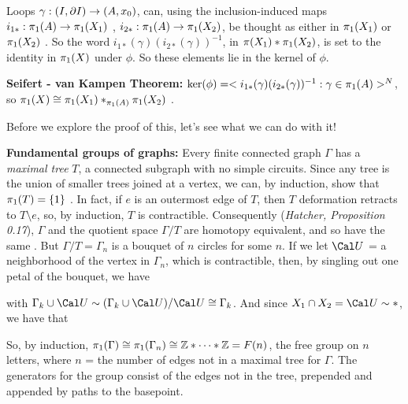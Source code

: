 \msk

Loops $\gamma:(I,\partial I)\rightarrow (A,x_0)$, can, using the inclusion-induced maps  
$i_{1*}:\pi_1(A)\rightarrow \pi_1(X_1)$ , $i_{2*}:\pi_1(A)\rightarrow \pi_1(X_2)$, be thought as either in 
$\pi_1(X_1)$ or $\pi_1(X_2)$ . So the word $i_{1*}(\gamma)(i_{2*}(\gamma))^{-1}$, in 
$\pi(X_1)*\pi_1(X_2)$, is set to the identity in $\pi_1(X)$ under $\phi$. So these 
elements lie in the kernel of $\phi$.

\msk

{\bf Seifert - van Kampen Theorem:} $\ker(\phi) = <i_{1*}(\gamma)(i_{2*}(\gamma))^{-1} : \gamma\in\pi_1(A) >^N$,
so $\pi_1(X)\cong \pi_1(X_1)*_{\pi_1(A)}\pi_1(X_2)$ . 

\bsk

Before we explore the proof of this, let's see what we can do with it!

\msk

{\bf Fundamental groups of graphs:} Every finite connected graph $\Gamma$ has a {\it maximal tree} $T$,
a connected subgraph with no simple circuits. Since any tree is the 
union of smaller trees joined at a vertex, we can, by induction, show that 
$\pi_1(T) = \{ 1\}$ . In fact, if $e$ is an outermost edge of $T$, then 
$T$ deformation retracts to $T\setminus e$, so, by induction, $T$ is 
contractible. Consequently ({\it Hatcher, Proposition 0.17}), $\Gamma$ and the quotient space $\Gamma/T$
are homotopy equivalent, and so have the same \mpu . But $\Gamma/T=\Gamma_n$
is a bouquet of $n$ circles for some $n$. If we let ${\Cal U}$ = a neighborhood of 
the vertex in $\Gamma_n$, which is contractible, then, by singling out one petal of the bouquet,
we have

\ssk


\ssk

with $\Gamma_{k}\cup{\Cal U}\sim (\Gamma_{k}\cup{\Cal U})/{\Cal U}\cong \Gamma_{k}$. 
And since $X_1\cap X_2={\Cal U}\sim *$, we have that 


So, by induction, $\pi_1(\Gamma) \cong \pi_1(\Gamma_{n})\cong {\Bbb Z}*\cdots *{\Bbb Z} = F(n)$, the free group on $n$ letters, where $n$ = the number of edges not in a maximal tree for $\Gamma$. The generators for the group consist of the
edges not in the tree, prepended and appended by paths to the basepoint.

\msk

